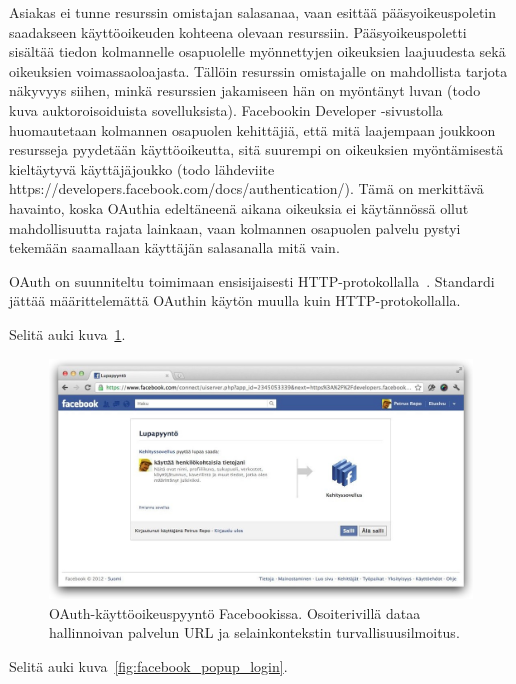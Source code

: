\documentclass[finnish,gradu]{tktltiki}
\begin{document}
  Asiakas ei tunne resurssin omistajan salasanaa, vaan esittää pääsyoikeuspoletin saadakseen käyttöoikeuden kohteena olevaan resurssiin. Pääsyoikeuspoletti sisältää tiedon kolmannelle osapuolelle myönnettyjen oikeuksien laajuudesta sekä oikeuksien voimassaoloajasta. Tällöin resurssin omistajalle on mahdollista tarjota näkyvyys siihen, minkä resurssien jakamiseen hän on myöntänyt luvan (todo kuva auktoroisoiduista sovelluksista). Facebookin Developer -sivustolla huomautetaan kolmannen osapuolen kehittäjiä, että mitä laajempaan joukkoon resursseja pyydetään käyttöoikeutta, sitä suurempi on oikeuksien myöntämisestä kieltäytyvä käyttäjäjoukko (todo lähdeviite https://developers.facebook.com/docs/authentication/). Tämä on merkittävä havainto, koska OAuthia edeltäneenä aikana oikeuksia ei käytännössä ollut mahdollisuutta rajata lainkaan, vaan kolmannen osapuolen palvelu pystyi tekemään saamallaan käyttäjän salasanalla mitä vain.

  OAuth on suunniteltu toimimaan ensisijaisesti HTTP-protokollalla~\cite{ietf_oauth2}.
  Standardi jättää määrittelemättä OAuthin käytön muulla kuin HTTP-protokollalla.

  Selitä auki kuva~\ref{fig:facebook_oauth_lupapyynto}.

  \begin{figure}
    \centering
    \includegraphics[width=1.0\textwidth]{images/facebook_oauth_lupapyynto.jpg}
    \caption{OAuth-käyttöoikeuspyyntö Facebookissa. Osoiterivillä dataa hallinnoivan palvelun URL ja selainkontekstin turvallisuusilmoitus.}
    \label{fig:facebook_oauth_lupapyynto}
  \end{figure}



  Selitä auki kuva~\ref{fig:facebook_popup_login}.
\end{document}
